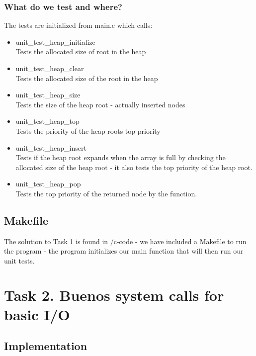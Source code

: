 \documentclass[a4paper,12pt,danish]{report}
\begin{document}
\subsubsection{What do we test and where?}
The tests are initialized from main.c which calls:
\\
\begin{itemize}
  \item{unit\_test\_heap\_initialize}
    \\
    Tests the allocated size of root in the heap
  \item{unit\_test\_heap\_clear}
    \\
    Tests the allocated size of the root in the heap
  \item{unit\_test\_heap\_size}
    \\
    Tests the size of the heap root - actually inserted nodes
  \item{unit\_test\_heap\_top}
    \\
    Tests the priority of the heap roots top priority
  \item{unit\_test\_heap\_insert}
    \\
    Tests if the heap root expands when the array is full by checking the allocated size of the heap root - it also tests the top priority of the heap root.
  \item{unit\_test\_heap\_pop}
    \\
    Tests the top priority of the returned node by the function.
\end{itemize}
\subsection{Makefile}
The solution to Task 1 is found in /c-code - we have included a Makefile to run the program - the program initializes our main function that will then run our unit tests.
\newpage
\section{Task 2. Buenos system calls for basic I/O}
\subsection{Implementation}
\end{document}
